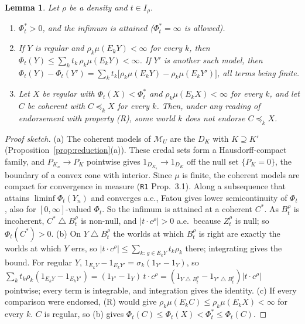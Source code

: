\documentclass[11pt]{article}
\newtheorem{lemma}[theorem]{Lemma}
\theoremstyle{definition}
\theoremstyle{remark}
\newcommand{\M}{\mathcal M}
\newcommand{\sd}{\mathbin{\triangle}}
\newcommand{\src}[1]{\texttt{#1}}
\begin{document}
\begin{lemma}\label{lem:H10}
Let $\rho$ be a density and $t\in I_\rho$.
\begin{enumerate}[leftmargin=*,label=(\alph*)]
\item $\Phi^*_t>0$, and the infimum is attained ($\Phi^*_t=\infty$ is allowed).
\item If $Y$ is regular and $\rho_k\mu(E_kY)<\infty$ for every $k$, then $\Phi_t(Y)\le\sum_kt_k\,\rho_k\mu(E_kY)<\infty$. If $Y'$ is another such model, then $\Phi_t(Y)-\Phi_t(Y')=\sum_kt_k\bigl[\rho_k\mu(E_kY)-\rho_k\mu(E_kY')\bigr]$, all terms being finite.
\item Let $X$ be regular with $\Phi_t(X)<\Phi^*_t$ and $\rho_k\mu(E_kX)<\infty$ for every $k$, and let $C$ be coherent with $C\preceq_kX$ for every $k$. Then, under any reading of endorsement with property (R), some world $k$ does not endorse $C\preceq_kX$.
\end{enumerate}
\end{lemma}
\begin{proof}[Proof sketch]
(a) The coherent models of $\M_U$ are the $D_K$ with $K\supseteq K'$ (Proposition~\ref{prop:reduction}(a)). These credal sets form a Hausdorff-compact family, and $P_{K_n}\to P_K$ pointwise gives $1_{D_{K_n}}\to1_{D_K}$ off the null set $\{P_K=0\}$, the boundary of a convex cone with interior. Since $\mu$ is finite, the coherent models are compact for convergence in measure (\src{R1} Prop.~3.1). Along a subsequence that attains $\liminf\Phi_t(Y_n)$ and converges a.e., Fatou gives lower semicontinuity of $\Phi_t$, also for $[0,\infty]$-valued $\Phi_t$. So the infimum is attained at a coherent $C^*$. As $B^\rho_t$ is incoherent, $C^*\sd B^\rho_t$ is non-null, and $|t\cdot c^\rho|>0$ a.e.\ because $Z^\rho_t$ is null; so $\Phi_t(C^*)>0$. (b) On $Y\sd B^\rho_t$ the worlds at which $B^\rho_t$ is right are exactly the worlds at which $Y$ errs, so $|t\cdot c^\rho|\le\sum_{k:\,g\in E_kY}t_k\rho_k$ there; integrating gives the bound. For regular $Y$, $1_{E_kY}-1_{E_kY'}=\sigma_k(1_{Y'}-1_Y)$, so $\sum_kt_k\rho_k(1_{E_kY}-1_{E_kY'})=(1_{Y'}-1_Y)\,t\cdot c^\rho=(1_{Y\sd B^\rho_t}-1_{Y'\sd B^\rho_t})|t\cdot c^\rho|$ pointwise; every term is integrable, and integration gives the identity. (c) If every comparison were endorsed, (R) would give $\rho_k\mu(E_kC)\le\rho_k\mu(E_kX)<\infty$ for every $k$. $C$ is regular, so (b) gives $\Phi_t(C)\le\Phi_t(X)<\Phi^*_t\le\Phi_t(C)$.
\end{proof}
\end{document}

